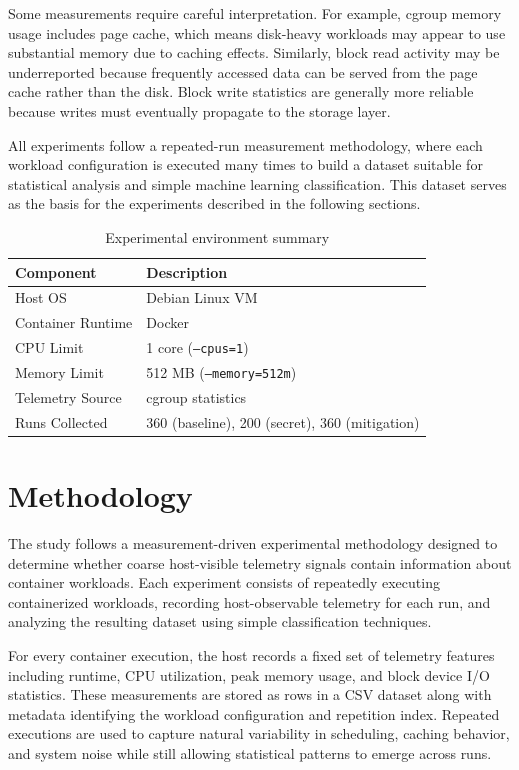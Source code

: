 \documentclass[11pt]{article}
\begin{document}
Some measurements require careful interpretation. For example, cgroup memory usage includes page cache, which means disk-heavy workloads may appear to use substantial memory due to caching effects. Similarly, block read activity may be underreported because frequently accessed data can be served from the page cache rather than the disk. Block write statistics are generally more reliable because writes must eventually propagate to the storage layer.

All experiments follow a repeated-run measurement methodology, where each workload configuration is executed many times to build a dataset suitable for statistical analysis and simple machine learning classification. This dataset serves as the basis for the experiments described in the following sections.

\begin{table}[H]
\centering
\begin{tabular}{ll}
\toprule
Component & Description \\
\midrule
Host OS & Debian Linux VM \\
Container Runtime & Docker \\
CPU Limit & 1 core (\texttt{--cpus=1}) \\
Memory Limit & 512 MB (\texttt{--memory=512m}) \\
Telemetry Source & cgroup statistics \\
Runs Collected & 360 (baseline), 200 (secret), 360 (mitigation) \\
\bottomrule
\end{tabular}
\caption{Experimental environment summary}
\label{tab:env_summary}
\end{table}

\section{Methodology}

The study follows a measurement-driven experimental methodology designed to determine whether coarse host-visible telemetry signals contain information about container workloads. Each experiment consists of repeatedly executing containerized workloads, recording host-observable telemetry for each run, and analyzing the resulting dataset using simple classification techniques.

For every container execution, the host records a fixed set of telemetry features including runtime, CPU utilization, peak memory usage, and block device I/O statistics. These measurements are stored as rows in a CSV dataset along with metadata identifying the workload configuration and repetition index. Repeated executions are used to capture natural variability in scheduling, caching behavior, and system noise while still allowing statistical patterns to emerge across runs.
\end{document}
